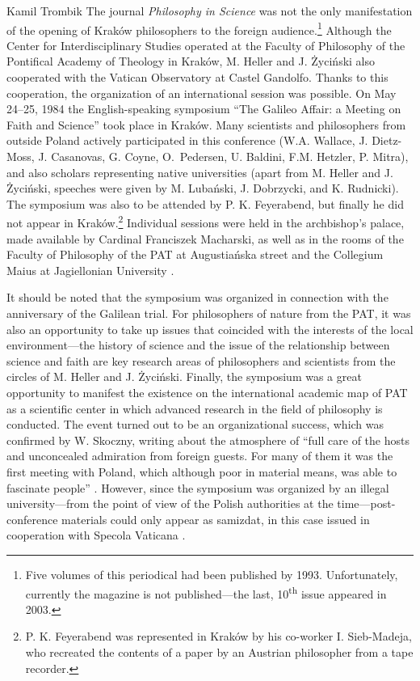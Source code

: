 \begin{artengenv}{Kamil Trombik}
The journal \textit{Philosophy in Science} was not the only manifestation of the opening of Kraków philosophers to the
foreign audience.\footnote{Five volumes of this periodical had been published by 1993. Unfortunately, currently the
magazine is not published---the last, 10\textsuperscript{th} issue appeared in 2003.} Although the Center for
Interdisciplinary Studies operated at the Faculty of Philosophy of the Pontifical Academy of Theology in Kraków, M.
Heller and J. Życiński also cooperated with the Vatican Observatory at Castel Gandolfo. Thanks to this cooperation, the
organization of an international session was possible. On May 24--25, 1984 the English-speaking symposium ``The Galileo
Affair: a Meeting on Faith and Science'' took place in Kraków. Many scientists and philosophers from outside Poland
actively participated in this conference (W.A. Wallace, J. Dietz-Moss, J. Casanovas, G. Coyne, O.~Pedersen, U. Baldini,
F.M. Hetzler, P. Mitra), and also scholars representing native universities (apart from M. Heller and J. Życiński,
speeches were given by M. Lubański, J. Dobrzycki, and K. Rudnicki). The symposium was also to be attended by P. K.
Feyerabend, but finally he did not appear in Kraków.\footnote{P. K. Feyerabend was represented in Kraków by his
co-worker I. Sieb-Madeja, who recreated the contents of a paper by an Austrian philosopher from a tape recorder.}
Individual sessions were held in the archbishop's palace, made available by Cardinal Franciszek Macharski, as well as
in the rooms of the Faculty of Philosophy of the PAT at Augustiańska street and the Collegium Maius at Jagiellonian
University
\parencite{skoczny_sympozjum_1984}.

It should be noted that the symposium was organized in connection with the anniversary of the Galilean trial. For
philosophers of nature from the PAT, it was also an opportunity to take up issues that coincided with the interests of
the local environment---the history of science and the issue of the relationship between science and faith are key
research areas of philosophers and scientists from the circles of M. Heller and J. Życiński. Finally, the symposium was
a great opportunity to manifest the existence on the international academic map of PAT as a scientific center in which
advanced research in the field of philosophy is conducted. The event turned out to be an organizational success, which
was confirmed by W. Skoczny, writing about the atmosphere of ``full care of the hosts and unconcealed admiration from
foreign guests. For many of them it was the first meeting with Poland, which although poor in material means, was able
to fascinate people''
\parencite[p.73]{skoczny_sympozjum_1984}.
However, since the symposium was organized by an
illegal university---from the point of view of the Polish authorities at the time---post-conference materials could
only appear as samizdat, in this case issued in cooperation with Specola Vaticana
\parencite{coyne_galileo_1985}.


\end{artengenv}
